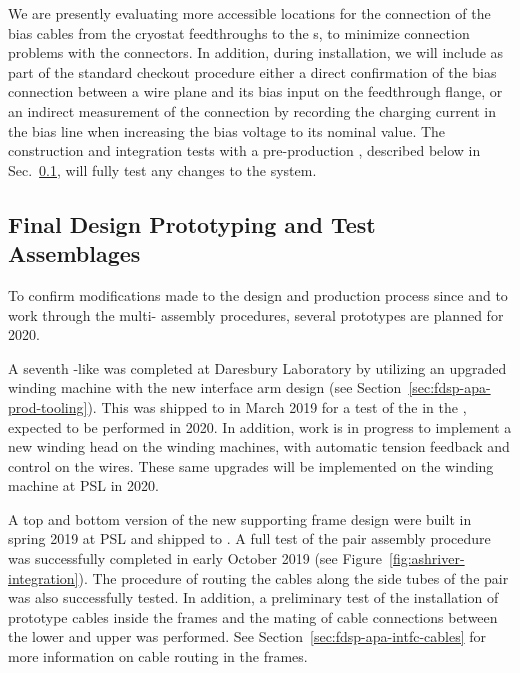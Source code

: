 We are presently evaluating more accessible locations for the connection of the bias  cables from the cryostat feedthroughs to the s, to minimize connection problems with the  connectors. In addition, during installation, we will include as part of the standard checkout procedure either a direct confirmation of the bias connection between a wire plane and its bias input on the feedthrough flange, or an indirect measurement of the connection by recording the charging current in the bias line when increasing the bias voltage to its nominal value.  The construction and integration tests with a pre-production , described below in Sec.~\ref{sec:fdsp-apa-qa-prototyping}, will fully test any changes to the  system. 


\subsection{Final Design Prototyping and Test Assemblages}
\label{sec:fdsp-apa-qa-prototyping}


To confirm modifications made to the  design and production process since  and to work through the multi- assembly procedures, several prototypes are planned for 2020.

A seventh -like  was completed at Daresbury Laboratory by utilizing an upgraded winding machine with the new interface arm design (see Section~\ref{sec:fdsp-apa-prod-tooling}). This  was shipped to  in March 2019 for a test of the  in the \coldbox, expected to be performed in 2020. In addition, work is in progress to implement a new winding head on the  winding machines, with automatic tension feedback and control on the wires. These same upgrades will be implemented on the winding machine at PSL in 2020. 

A top and bottom version of the new supporting  frame design were built in spring 2019 at PSL and shipped to .  A full test of the  pair assembly procedure was successfully completed in early October 2019 (see Figure~\ref{fig:ashriver-integration}). The procedure of routing the  cables along the side tubes of the  pair was also successfully tested. In addition, a preliminary test of the installation of  prototype cables inside the  frames and the mating of cable connections between the lower and upper  was performed.  See Section~\ref{sec:fdsp-apa-intfc-cables}  for more information on cable routing in the  frames. 


